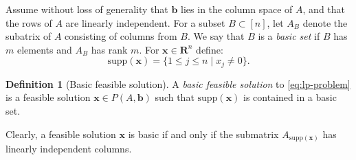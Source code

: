 \documentclass{amsbook}
\newcommand{\xx}{\mathbf x}
\newcommand{\bb}{\mathbf b}
\newcommand{\supp}{\mathrm{supp}}
\newcommand{\RR}{\mathbf R}
\theoremstyle{definition}
\newtheorem{definition}[theorem]{Definition}
\theoremstyle{remark}
\begin{document}
Assume without loss of generality that $\bb$ lies in the column space of $A$, and that the rows of $A$ are linearly independent.
For a subset $B\subset [n]$, let $A_B$ denote the subatrix of $A$ consisting of columns from $B$.
We say that $B$ is a \emph{basic set} if $B$ has $m$ elements and $A_B$ has rank $m$.
For $\xx\in \RR^n$ define:
\begin{displaymath}
  \supp(\xx)=\{1\leq j\leq n\mid x_j\neq 0\}.
\end{displaymath}
\begin{definition}
  [Basic feasible solution]
  A \emph{basic feasible solution} to \eqref{eq:lp-problem} is a feasible solution $\xx\in P(A,\bb)$ such that $\supp(\xx)$ is contained in a basic set.
\end{definition}
Clearly, a feasible solution $\xx$ is basic if and only if the submatrix $A_{\supp(\xx)}$ has linearly independent columns.
\end{document}
